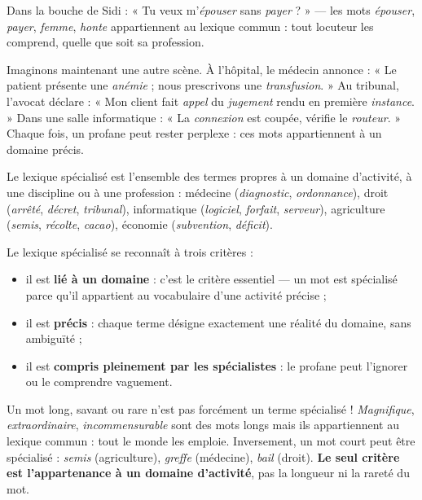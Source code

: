 \documentclass[11pt]{article}
\newcommand{\cle}[1]{{\popxbold\color{popdark}#1}}
\newcounter{popsec}
\newcounter{popsub}
\newcommand{\courssub}[1]{%
  \stepcounter{popsub}%
  \par\vspace{9pt}\noindent{\popxbold\fontsize{11.5}{13}\selectfont\color{popink}{\color{poporange}\thepopsec.\thepopsub}\hspace{6pt}#1}\par\nopagebreak\vspace{4pt}
}
\begin{document}
\begin{exemplebox}
Dans la bouche de Sidi : « Tu veux m'\emph{épouser} sans \emph{payer} ? » — les mots \emph{épouser}, \emph{payer}, \emph{femme}, \emph{honte} appartiennent au lexique commun : tout locuteur les comprend, quelle que soit sa profession.
\end{exemplebox}

\courssub{Le lexique spécialisé}

Imaginons maintenant une autre scène. À l'hôpital, le médecin annonce : « Le patient présente une \emph{anémie} ; nous prescrivons une \emph{transfusion}. » Au tribunal, l'avocat déclare : « Mon client fait \emph{appel} du \emph{jugement} rendu en première \emph{instance}. » Dans une salle informatique : « La \emph{connexion} est coupée, vérifie le \emph{routeur}. » Chaque fois, un profane peut rester perplexe : ces mots appartiennent à un domaine précis.

\begin{definition}
Le \cle{lexique spécialisé} est l'ensemble des termes propres à un domaine d'activité, à une discipline ou à une profession : médecine (\emph{diagnostic}, \emph{ordonnance}), droit (\emph{arrêté}, \emph{décret}, \emph{tribunal}), informatique (\emph{logiciel}, \emph{forfait}, \emph{serveur}), agriculture (\emph{semis}, \emph{récolte}, \emph{cacao}), économie (\emph{subvention}, \emph{déficit}).
\end{definition}

Le lexique spécialisé se reconnaît à trois critères :

\begin{itemize}
\item il est \textbf{lié à un domaine} : c'est le critère essentiel — un mot est spécialisé parce qu'il appartient au vocabulaire d'une activité précise ;
\item il est \textbf{précis} : chaque terme désigne exactement une réalité du domaine, sans ambiguïté ;
\item il est \textbf{compris pleinement par les spécialistes} : le profane peut l'ignorer ou le comprendre vaguement.
\end{itemize}

\begin{attention}
Un mot long, savant ou rare n'est pas forcément un terme spécialisé ! \emph{Magnifique}, \emph{extraordinaire}, \emph{incommensurable} sont des mots longs mais ils appartiennent au lexique commun : tout le monde les emploie. Inversement, un mot court peut être spécialisé : \emph{semis} (agriculture), \emph{greffe} (médecine), \emph{bail} (droit). \textbf{Le seul critère est l'appartenance à un domaine d'activité}, pas la longueur ni la rareté du mot.
\end{attention}
\end{document}
